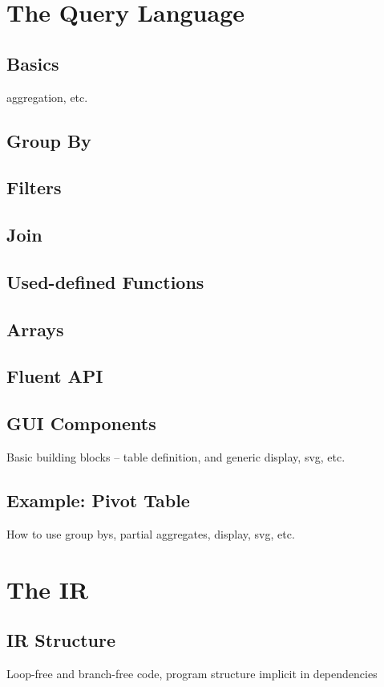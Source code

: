 \documentclass[runningheads]{llncs}
\begin{document}
\section{The Query Language}
\subsection{Basics}
aggregation, etc.

\subsection{Group By}
\subsection{Filters}
\subsection{Join}
\subsection{Used-defined Functions}
\subsection{Arrays}
\subsection{Fluent API}

\subsection{GUI Components}
Basic building blocks -- table definition, and generic display, svg, etc. 

\subsection{Example: Pivot Table}
How to use group bys, partial aggregates, display, svg, etc.

\section{The IR}
\subsection{IR Structure}
Loop-free and branch-free code, program structure implicit in dependencies
\end{document}
